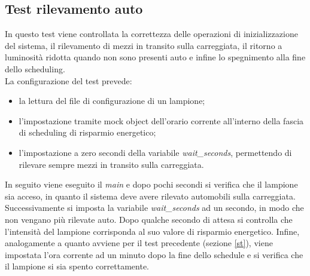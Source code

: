 \subsection{Test rilevamento auto}
In questo test viene controllata la correttezza delle operazioni di inizializzazione del sistema, il rilevamento di mezzi in transito sulla carreggiata, il ritorno a luminosità ridotta quando non sono presenti auto e infine lo spegnimento alla fine dello scheduling.
\\La configurazione del test prevede:
\begin{itemize}
	\item la lettura del file di configurazione di un lampione;
	\item l'impostazione tramite mock object dell'orario corrente all'interno della fascia di scheduling di risparmio energetico;
	\item l'impostazione a zero secondi della variabile \textit{wait\_seconds}, permettendo di rilevare sempre mezzi in transito sulla carreggiata.
\end{itemize}
In seguito viene eseguito il \textit{main} e dopo pochi secondi si verifica che il lampione sia acceso, in quanto il sistema deve avere rilevato automobili sulla carreggiata.
Successivamente si imposta la variabile \textit{wait\_seconds} ad un secondo, in modo che non vengano più rilevate auto.
Dopo qualche secondo di attesa si controlla che l'intensità del lampione corrisponda al suo valore di risparmio energetico.
Infine, analogamente a quanto avviene per il test precedente (sezione \ref{st}), viene impostata l'ora corrente ad un minuto dopo la fine dello schedule e si verifica che il lampione si sia spento correttamente.



